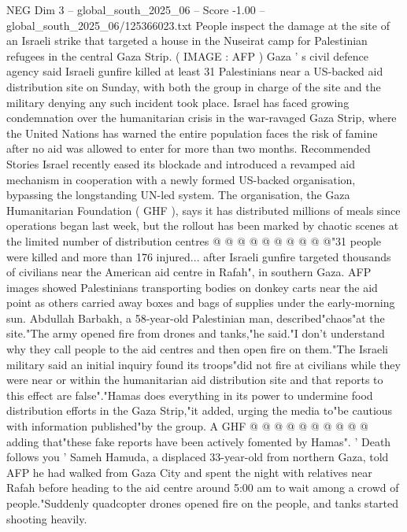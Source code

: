 \begin{textsample}{NEG Dim 3 – global\_south\_2025\_06 – Score -1.00 – global\_south\_2025\_06/125366023.txt}  \label{ex:f3_neg_251}
People inspect the damage at the site of an Israeli strike that targeted a house in the Nuseirat camp for Palestinian refugees in the central Gaza Strip. ( IMAGE : AFP ) Gaza ' s civil defence agency said Israeli gunfire killed at least 31 Palestinians near a US-backed aid distribution site on Sunday, with both the group in charge of the site and the military denying any such incident took place.
Israel has faced growing condemnation over the humanitarian crisis in the war-ravaged Gaza Strip, where the United Nations has warned the entire population faces the risk of famine after no aid was allowed to enter for more than two months.
Recommended Stories Israel recently eased its blockade and introduced a revamped aid mechanism in cooperation with a newly formed US-backed organisation, bypassing the longstanding UN-led system.
The organisation, the Gaza Humanitarian Foundation ( GHF ), says it has distributed millions of meals since operations began last week, but the rollout has been marked by chaotic scenes at the limited number of distribution centres @ @ @ @ @ @ @ @ @ @"31 people were killed and more than 176 injured... after Israeli gunfire targeted thousands of civilians near the American aid centre in Rafah", in southern Gaza.
AFP images showed Palestinians transporting bodies on donkey carts near the aid point as others carried away boxes and bags of supplies under the early-morning sun.
Abdullah Barbakh, a 58-year-old Palestinian man, described"chaos"at the site."The army opened fire from drones and tanks,"he said."I don't understand why they call people to the aid centres and then open fire on them."The Israeli military said an initial inquiry found its troops"did not fire at civilians while they were near or within the humanitarian aid distribution site and that reports to this effect are false"."Hamas does everything in its power to undermine food distribution efforts in the Gaza Strip,"it added, urging the media to"be cautious with information published"by the group.
A GHF @ @ @ @ @ @ @ @ @ @ adding that"these fake reports have been actively fomented by Hamas". ' Death follows you ' Sameh Hamuda, a displaced 33-year-old from northern Gaza, told AFP he had walked from Gaza City and spent the night with relatives near Rafah before heading to the aid centre around 5:00 am to wait among a crowd of people."Suddenly quadcopter drones opened fire on the people, and tanks started shooting heavily.

\end{textsample}
